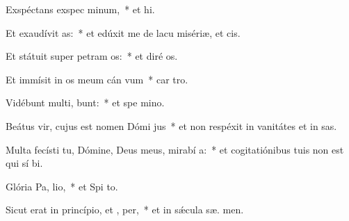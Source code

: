 \item Exspéctans exspec minum,~* et  hi.
\item Et exaudívit  as:~* et edúxit me de lacu misériæ, et   cis.
\item Et státuit super petram  os:~* et diré  os.
\item Et immísit in os meum cán vum~* car  tro.
\item Vidébunt multi,  bunt:~* et spe  mino.
\item Beátus vir, cujus est nomen Dómi  jus~* et non respéxit in vanitátes et in sas.
\item Multa fecísti tu, Dómine, Deus meus, mirabí a:~* et cogitatiónibus tuis non est qui sí  bi.
\item Glória Pa,  lio,~* et Spi to.
\item Sicut erat in princípio, et ,  per,~* et in sǽcula sæ. men.
